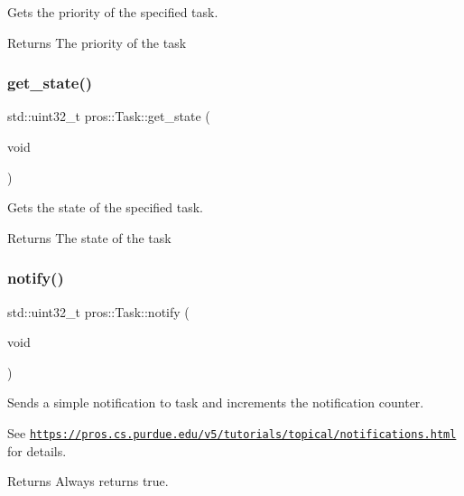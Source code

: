 Gets the priority of the specified task. 

\begin{DoxyReturn}{Returns}
The priority of the task 
\end{DoxyReturn}
\mbox{\label{classpros_1_1Task_a45f0b63eec57e7fe8adf3876988588bf}} 
\subsubsection{\texorpdfstring{get\+\_\+state()}{get\_state()}}
{\footnotesize\ttfamily std\+::uint32\+\_\+t pros\+::\+Task\+::get\+\_\+state (\begin{DoxyParamCaption}\item[{void}]{ }\end{DoxyParamCaption})}



Gets the state of the specified task. 

\begin{DoxyReturn}{Returns}
The state of the task 
\end{DoxyReturn}
\mbox{\label{classpros_1_1Task_ad376e3065701ba4853d4be1c90c0544c}} 
\subsubsection{\texorpdfstring{notify()}{notify()}}
{\footnotesize\ttfamily std\+::uint32\+\_\+t pros\+::\+Task\+::notify (\begin{DoxyParamCaption}\item[{void}]{ }\end{DoxyParamCaption})}



Sends a simple notification to task and increments the notification counter. 

See \href{https://pros.cs.purdue.edu/v5/tutorials/topical/notifications.html}{\tt https\+://pros.\+cs.\+purdue.\+edu/v5/tutorials/topical/notifications.\+html} for details.

\begin{DoxyReturn}{Returns}
Always returns true. 
\end{DoxyReturn}
\mbox{\label{classpros_1_1Task_a6fc6c97f2dd9fc92b6b9ff47557f215f}} 
